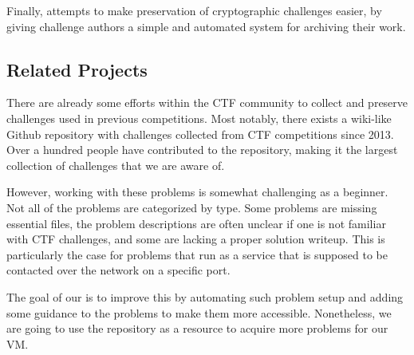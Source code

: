Finally, \cvm{} attempts to make preservation of cryptographic
challenges easier, by giving challenge authors a simple and automated
system for archiving their work.

\subsection{Related Projects}
There are already some efforts within the CTF community to collect and preserve
challenges used in previous competitions. Most notably, there exists a wiki-like
Github repository \cite{ctf:github} with challenges collected from CTF
competitions since 2013. Over a hundred people have contributed to the
repository, making it the largest collection of challenges that we are aware of.

However, working with these problems is somewhat challenging as a beginner. Not
all of the problems are categorized by type. Some problems are missing
essential files, the problem descriptions are often unclear if one is not
familiar with CTF challenges, and some are lacking a proper solution writeup.
This is particularly the case for problems that run as a service that is
supposed to be contacted over the network on a specific port.

The goal of our \cvm{} is to improve this by automating such problem setup and
adding some guidance to the problems to make them more accessible. Nonetheless,
we are going to use the repository as a resource to acquire more problems for
our VM.


